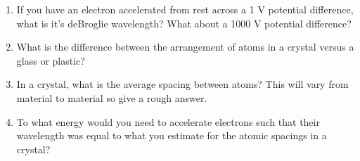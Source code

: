 \documentclass{tufte-handout}
\begin{document}
\begin{enumerate}
\item If you have an electron accelerated from rest across a 1 V potential difference, what is it's deBroglie wavelength? 
What about a 1000 V potential difference?

\item What is the difference between the arrangement of atoms in a crystal versus a glass or plastic?

\item In a crystal, what is the average spacing between atoms? This will vary from material to material 
so give a rough answer. 

\item To what energy would you need to accelerate electrons such that their wavelength was equal to
what you estimate for the atomic spacings in a crystal?

\end{enumerate}
\end{document}
